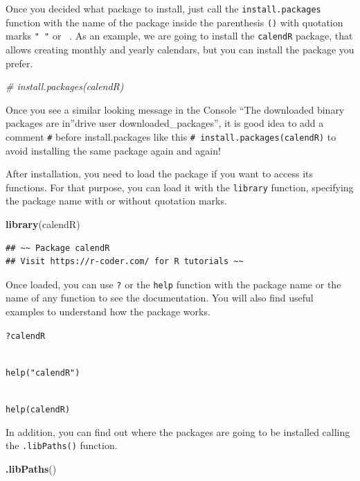 \documentclass[
]{book}
\newenvironment{Shaded}{\begin{snugshade}}{\end{snugshade}}
\newcommand{\CommentTok}[1]{\textcolor[rgb]{0.56,0.35,0.01}{\textit{#1}}}
\newcommand{\FunctionTok}[1]{\textcolor[rgb]{0.13,0.29,0.53}{\textbf{#1}}}
\newcommand{\NormalTok}[1]{#1}
\begin{document}
Once you decided what package to install, just call the \texttt{install.packages} function with the name of the package inside the parenthesis \texttt{()} with quotation marks \texttt{"\ "} or \texttt{\textquotesingle{}\ \textquotesingle{}}. As an example, we are going to install the \texttt{calendR} package, that allows creating monthly and yearly calendars, but you can install the package you prefer.

\begin{Shaded}
\begin{Highlighting}[]
\CommentTok{\# install.packages(\textquotesingle{}calendR\textquotesingle{})}
\end{Highlighting}
\end{Shaded}

Once you see a similar looking message in the Console ``The downloaded binary packages are in''drive user downloaded\_packages'', it is good idea to add a comment \texttt{\#} before install.packages like this \texttt{\#\ install.packages(\textquotesingle{}calendR\textquotesingle{})} to avoid installing the same package again and again!

After installation, you need to load the package if you want to access its functions. For that purpose, you can load it with the \texttt{library} function, specifying the package name with or without quotation marks.

\begin{Shaded}
\begin{Highlighting}[]
\FunctionTok{library}\NormalTok{(calendR)}
\end{Highlighting}
\end{Shaded}

\begin{verbatim}
## ~~ Package calendR
## Visit https://r-coder.com/ for R tutorials ~~
\end{verbatim}

Once loaded, you can use \texttt{?} or the \texttt{help} function with the package name or the name of any function to see the documentation. You will also find useful examples to understand how the package works.

\texttt{?calendR}\strut \\
\texttt{help("calendR")}\strut \\
\texttt{help(calendR)}

In addition, you can find out where the packages are going to be installed calling the \texttt{.libPaths()} function.

\begin{Shaded}
\begin{Highlighting}[]
\FunctionTok{.libPaths}\NormalTok{()}
\end{Highlighting}
\end{Shaded}
\end{document}
